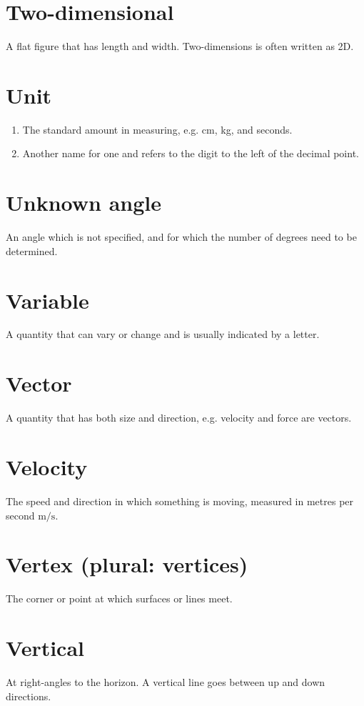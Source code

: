 \documentclass[10pt]{article}
\begin{document}
\section*{Two-dimensional}
A flat figure that has length and width. Two-dimensions is often written as 2D.

\section*{Unit}
\begin{enumerate}
  \item The standard amount in measuring, e.g. cm, kg, and seconds.
  \item Another name for one and refers to the digit to the left of the decimal point.
\end{enumerate}

\section*{Unknown angle}
An angle which is not specified, and for which the number of degrees need to be determined.

\section*{Variable}
A quantity that can vary or change and is usually indicated by a letter.

\section*{Vector}
A quantity that has both size and direction, e.g. velocity and force are vectors.

\section*{Velocity}
The speed and direction in which something is moving, measured in metres per second $\mathrm{m} / \mathrm{s}$.

\section*{Vertex (plural: vertices)}
The corner or point at which surfaces or lines meet.

\section*{Vertical}
At right-angles to the horizon. A vertical line goes between up and down directions.
\end{document}
